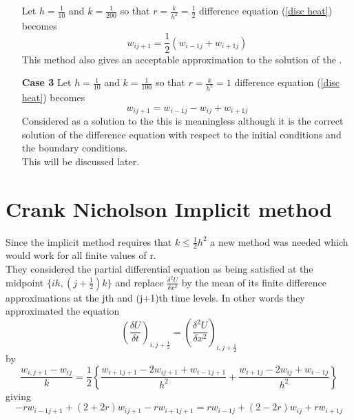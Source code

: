 \begin{example}
\begin{enumerate}
Let $h=\frac{1}{10}$ and $k=\frac{1}{200}$ so that $r=\frac{k}{h^2}=\frac{1}{2}$
difference equation (\ref{disc heat}) becomes
\[
w_{ij+1}=\frac{1}{2}(w_{i-1j}+w_{i+1j})
\]
This method also gives an acceptable approximation to the solution of the .
\item[\textbf{Case 3}]
Let $h=\frac{1}{10}$ and $k=\frac{1}{100}$ so that $r=\frac{k}{h^2}=1$
difference equation (\ref{disc heat}) becomes
\[
w_{ij+1}=w_{i-1j}-w_{ij}+w_{i+1j}
\]
Considered as a solution to the  this is meaningless although it is the correct
solution of the difference equation with respect to the initial conditions and the boundary conditions.\\
This will be discussed later.

\end{enumerate}
\end{example}
\section{Crank Nicholson Implicit method}
Since the implicit method requires that $k\leq \frac{1}{2}h^2$ a new method was
needed which would work for all finite values of r.\\
They considered the partial differential equation as being satisfied at the
midpoint $\{ih,(j+\frac{1}{2})k \}$ and replace $\frac{\delta^2 U}{\delta x^2}$ by the
mean of its finite difference approximations at the jth and (j+1)th time levels.
In other words they approximated the equation
\[ \left(\frac{\delta U}{\delta t}\right)_{i,j+\frac{1}{2}}
= 
 \left(\frac{\delta^2 U}{\delta x^2}\right)_{i,j+\frac{1}{2}}\]
by
\[\frac{w_{i,j+1}-w_{ij}}{k}=\frac{1}{2}\left\{\frac{w_{i+1j+1}-2w_{ij+1}+w_{i-1j+1}}{h^2}+
\frac{w_{i+1j}-2w_{ij}+w_{i-1j}}{h^2}
\right\}
\]
giving
\begin{equation}
\label{2 crank}
-rw_{i-1j+1}+(2+2r)w_{ij+1}-rw_{i+1j+1}
=
rw_{i-1j}+(2-2r)w_{ij}+rw_{i+1j}
\end{equation}

